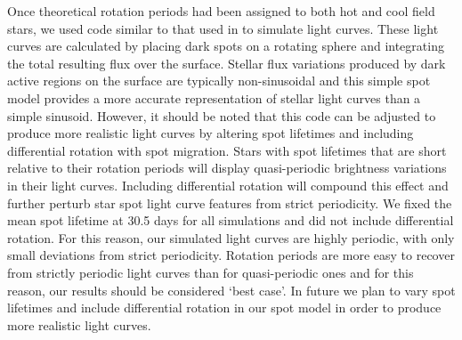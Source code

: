 Once theoretical rotation periods had been assigned to both hot and cool field
stars, we used code similar to that used in \citet{Aigrain2015b} to simulate
light curves.
These light curves are calculated by placing dark spots on a rotating sphere
and integrating the total resulting flux over the surface.
Stellar flux variations produced by dark active regions on the surface are
typically non-sinusoidal and this simple spot model provides a more accurate
representation of stellar light curves than a simple sinusoid.
However, it should be noted that this code can be adjusted to produce more
realistic light curves by altering spot lifetimes and including differential
rotation with spot migration.
Stars with spot lifetimes that are short relative to their rotation periods
will display quasi-periodic brightness variations in their light curves.
Including differential rotation will compound this effect and further perturb
star spot light curve features from strict periodicity.
We fixed the mean spot lifetime at 30.5 days for all simulations and did not
include differential rotation.
For this reason, our simulated light curves are highly periodic, with only
small deviations from strict periodicity.
Rotation periods are more easy to recover from strictly periodic light curves
than for quasi-periodic ones and for this reason, our results should be
considered `best case'.
In future we plan to vary spot lifetimes and include differential rotation in
our spot model in order to produce more realistic light curves.


